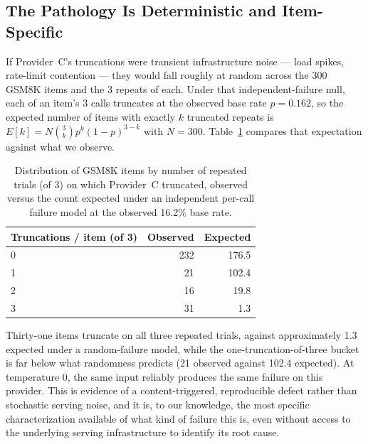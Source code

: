\documentclass[11pt]{article}
\begin{document}
\subsection{The Pathology Is Deterministic and Item-Specific}
\label{sec:determinism}

If Provider~C's truncations were transient infrastructure noise ---
load spikes, rate-limit contention --- they would fall roughly at
random across the 300 GSM8K items and the 3 repeats of each. Under
that independent-failure null, each of an item's 3 calls truncates at
the observed base rate $p = 0.162$, so the expected number of items
with exactly $k$ truncated repeats is $E[k] = N \binom{3}{k} p^k
(1-p)^{3-k}$ with $N = 300$. Table~\ref{tab:item} compares that
expectation against what we observe.

\begin{table}[t]
\centering
\small
\begin{tabular}{lrr}
\toprule
\textbf{Truncations / item (of 3)} & \textbf{Observed} & \textbf{Expected} \\
\midrule
0 & 232 & 176.5 \\
1 & 21  & 102.4 \\
2 & 16  & 19.8  \\
3 & 31  & 1.3   \\
\bottomrule
\end{tabular}
\caption{Distribution of GSM8K items by number of repeated trials (of
3) on which Provider~C truncated, observed versus the count expected
under an independent per-call failure model at the observed 16.2\%
base rate.}
\label{tab:item}
\end{table}

Thirty-one items truncate on all three repeated trials, against
approximately 1.3 expected under a random-failure model, while the
one-truncation-of-three bucket is far below what randomness predicts
(21 observed against 102.4 expected).
At temperature 0, the same input reliably produces the same failure on
this provider. This is evidence of a content-triggered, reproducible
defect rather than stochastic serving noise, and it is, to our
knowledge, the most specific characterization available of what kind
of failure this is, even without access to the underlying serving
infrastructure to identify its root cause.
\end{document}
